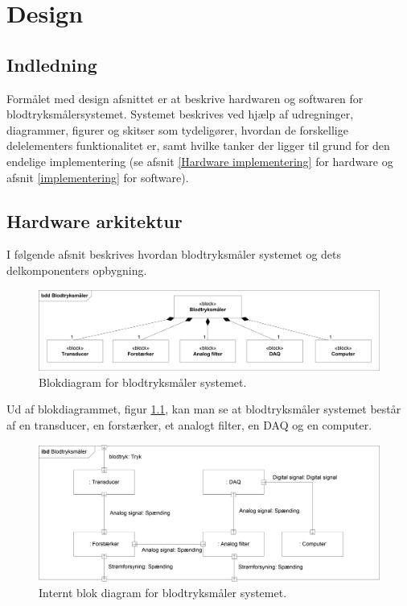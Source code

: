 \chapter{Design}

\section{Indledning}
Formålet med design afsnittet er at beskrive hardwaren og softwaren for blodtryksmålersystemet. Systemet beskrives ved hjælp af udregninger, diagrammer, figurer og skitser som tydeligører, hvordan de forskellige delelementers funktionalitet er, samt hvilke tanker der ligger til grund for den endelige implementering (se afsnit \ref{Hardware implementering} for hardware og afsnit \ref{implementering} for software).

\section{Hardware arkitektur}
I følgende afsnit beskrives hvordan blodtryksmåler systemet og dets delkomponenters opbygning.
\\
\begin{figure}[H]
	\centering
	\includegraphics[width=1\textwidth]{Figurer/Hardware/BDD1}
	\caption{Blokdiagram for blodtryksmåler systemet.}
	\label{BDD blodtryksmaaler}
\end{figure}

Ud af blokdiagrammet, figur \ref{BDD blodtryksmaaler}, kan man se at blodtryksmåler systemet består af en transducer, en forstærker, et analogt filter, en DAQ og en computer.\\
\begin{figure}[H]
	\centering
	\includegraphics[width=1\textwidth]{Figurer/Hardware/IBD}
	\caption{Internt blok diagram for blodtryksmåler systemet.}
	\label{IBD blodtryksmaaler}
\end{figure}

